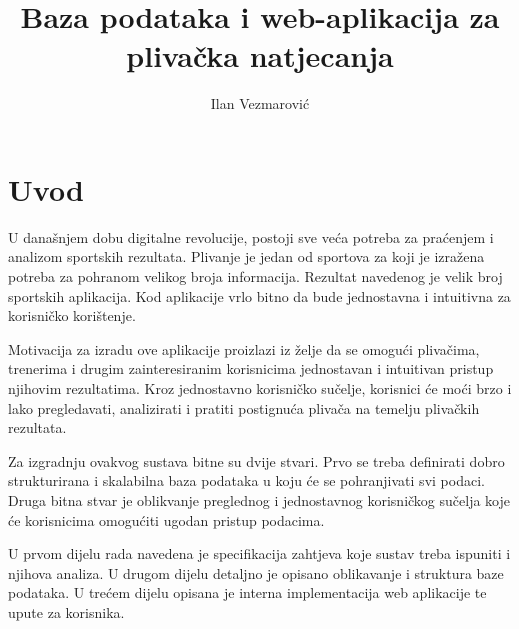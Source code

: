 \documentclass[times, utf8, zavrsni]{fer}
\begin{document}

\title{Baza podataka i web-aplikacija za plivačka natjecanja}

\author{Ilan Vezmarović}

\maketitle


\zahvala{}

\tableofcontents

\chapter{Uvod}
U današnjem dobu digitalne revolucije, postoji sve veća potreba za praćenjem i analizom sportskih rezultata. 
Plivanje je jedan od sportova za koji je izražena potreba za pohranom velikog broja informacija.
Rezultat navedenog je velik broj sportskih aplikacija. Kod aplikacije vrlo bitno da bude
jednostavna i intuitivna za korisničko korištenje.

\vspace{\baselineskip}

Motivacija za izradu ove aplikacije proizlazi iz želje da se omogući plivačima, trenerima i 
drugim zainteresiranim korisnicima jednostavan i intuitivan pristup njihovim rezultatima. 
Kroz jednostavno korisničko sučelje, korisnici će moći brzo i lako pregledavati, 
analizirati i pratiti postignuća plivača na temelju plivačkih rezultata.

\vspace{\baselineskip}

Za izgradnju ovakvog sustava bitne su dvije stvari. Prvo se treba definirati
dobro strukturirana i skalabilna baza podataka u koju će se pohranjivati svi podaci.
Druga bitna stvar je oblikvanje preglednog i jednostavnog korisničkog sučelja koje će
korisnicima omogućiti ugodan pristup podacima.

\vspace{\baselineskip}

U prvom dijelu rada navedena je specifikacija zahtjeva koje sustav treba ispuniti i njihova analiza.
U drugom dijelu detaljno je opisano oblikavanje i struktura baze podataka. U trećem dijelu opisana je interna 
implementacija web aplikacije te upute za korisnika.
\end{document}
